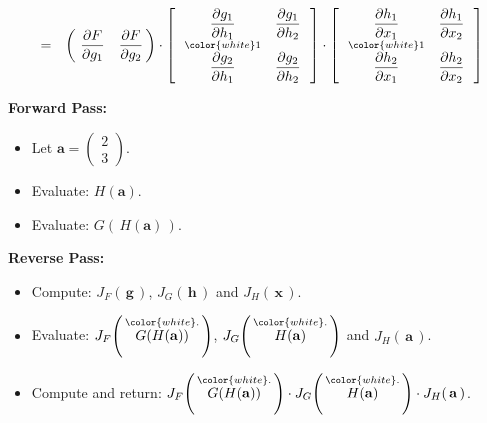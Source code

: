 \begin{eqnarray*}
\\
& = &
	\left(\!\begin{array}{cc}
		\dfrac{\partial F}{\partial g_{1}} & \dfrac{\partial F}{\partial g_{2}}
		\end{array}\!\!\right)
	\cdot
	\left[\,\begin{array}{cc}
		\dfrac{\partial g_{1}}{\partial h_{1}} & \dfrac{\partial g_{1}}{\partial h_{2}}
		\\
		\overset{{\color{white}1}}{\dfrac{\partial g_{2}}{\partial h_{1}}} & \dfrac{\partial g_{2}}{\partial h_{2}}
		\end{array}\,\right]
	\cdot
	\left[\,\begin{array}{cc}
		\dfrac{\partial h_{1}}{\partial x_{1}} & \dfrac{\partial h_{1}}{\partial x_{2}}
		\\
		\overset{{\color{white}1}}{\dfrac{\partial h_{2}}{\partial x_{1}}} & \dfrac{\partial h_{2}}{\partial x_{2}}
		\end{array}\,\right]
\end{eqnarray*}

\vskip 0.5cm
\noindent
\textbf{Forward Pass:}
\begin{itemize}
\item
	Let \;$\mathbf{a} = \left(\!\begin{array}{c} 2 \\ 3 \end{array}\!\right)$.
\item
	Evaluate: \;$H(\mathbf{a})$.
\item
	Evaluate: \;$G(\,H(\mathbf{a})\,)$.
\end{itemize}
\vskip 0.3cm
\noindent
\textbf{Reverse Pass:}
\begin{itemize}
\item
	Compute:\;
	$J_{F}\!\left(\,\mathbf{g}\,\right)$,
	$J_{G}\!\left(\,\mathbf{h}\,\right)$ and
	$J_{H}\!\left(\,\mathbf{x}\,\right)$.
\item
	Evaluate:\;
	$J_{F}\!\left(\,\overset{{\color{white}.}}{G(H(\mathbf{a}))}\,\right)$,
	$J_{G}\!\left(\,\overset{{\color{white}.}}{H(\mathbf{a})}\,\right)$ and
	$J_{H}\!\left(\,\mathbf{a}\,\right)$.
\item
	Compute and return:\;
	$J_{F}\!\left(\,\overset{{\color{white}.}}{G(H(\mathbf{a}))}\,\right)
	\cdot
	J_{G}\!\left(\,\overset{{\color{white}.}}{H(\mathbf{a})}\,\right)
	\cdot
	J_{H}\!\left(\,\mathbf{a}\,\right)$.
\end{itemize}

